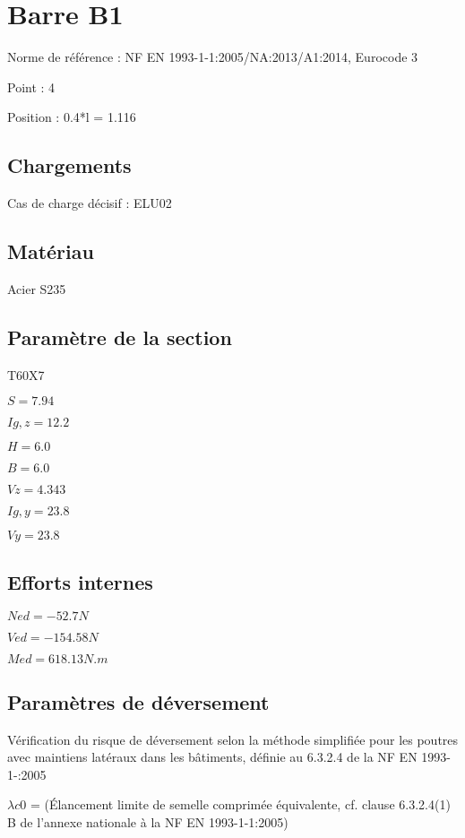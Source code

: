 \documentclass[10pt,a4paper,titlepage]{report}
\begin{document}
\section{Barre B1}

Norme de référence : NF EN 1993-1-1:2005/NA:2013/A1:2014, Eurocode 3

Point : 4

Position : 0.4*l = 1.116

\subsection{Chargements}

Cas de charge décisif : ELU02

\subsection{Matériau}

Acier S235

\subsection{Paramètre de la section}

T60X7

$S = 7.94$

$I{g,z} = 12.2$

$H = 6.0$

$B = 6.0$

$V{z} = 4.343$

$I{g,y} = 23.8$

$V{y} = 23.8$

\subsection{Efforts internes}

$N{ed} = -52.7 N$

$V{ed} = -154.58 N$

$M{ed} = 618.13 N.m$


\subsection{Paramètres de déversement}

Vérification du risque de déversement selon la méthode simplifiée pour les poutres avec maintiens latéraux dans les bâtiments, définie au 6.3.2.4 de la NF EN 1993-1-:2005

$\lambda {c0}$ = (Élancement limite de semelle comprimée équivalente, cf. clause 6.3.2.4(1) B de l'annexe nationale à la NF EN 1993-1-1:2005)
\end{document}
